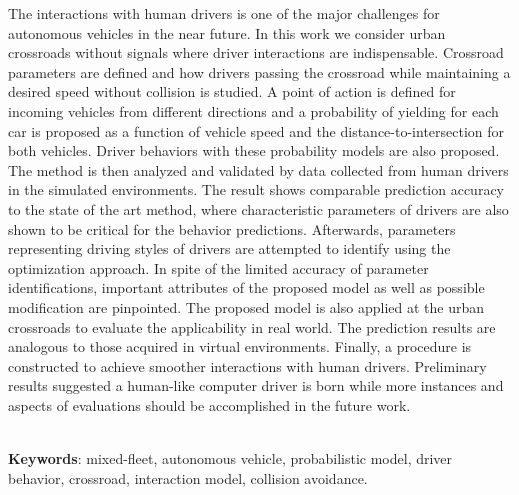 The interactions with human drivers is one of the major challenges for autonomous vehicles in the near future. In this work we consider urban crossroads without signals where driver interactions are indispensable. Crossroad parameters are defined and how drivers passing the crossroad while maintaining a desired speed without collision is studied. A point of action is defined for incoming vehicles from different directions and a probability of yielding for each car is proposed as a function of vehicle speed and the distance-to-intersection for both vehicles. Driver behaviors with these probability models are also proposed. The method is then analyzed and validated by data collected from human drivers in the simulated environments. The result shows comparable prediction accuracy to the state of the art method, where characteristic parameters of drivers are also shown to be critical for the behavior predictions. Afterwards, parameters representing driving styles of drivers are attempted to identify using the optimization approach. In spite of the limited accuracy of parameter identifications, important attributes of the proposed model as well as possible modification are pinpointed. The proposed model is also applied at the urban crossroads to evaluate the applicability in real world. The prediction results are analogous to those acquired in virtual environments. Finally, a procedure is constructed to achieve smoother interactions with human drivers. Preliminary results suggested a human-like computer driver is born while more instances and aspects of evaluations should be accomplished in the future work.

~\\

\textbf{Keywords}: mixed-fleet, autonomous vehicle, probabilistic model, driver behavior, crossroad, interaction model, collision avoidance.